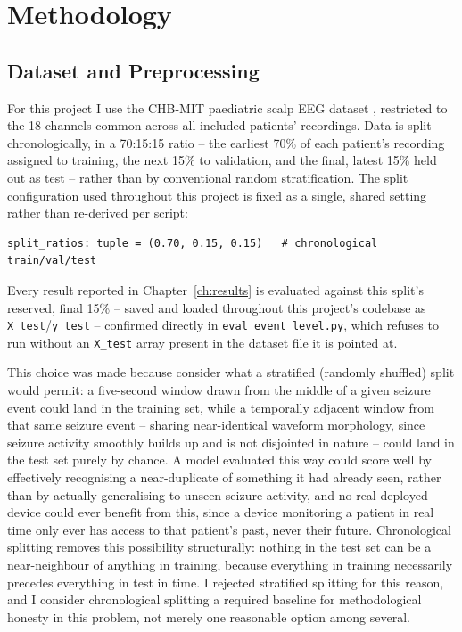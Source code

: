 \chapter{Methodology}
\label{ch:methodology}

\section{Dataset and Preprocessing}

For this project I use the CHB-MIT paediatric scalp EEG dataset \citep{goldberger2000}, restricted to the 18 channels common across all included patients' recordings. Data is split chronologically, 
in a 70:15:15 ratio -- the earliest 70\% of each patient's recording assigned to training, the next 15\% to validation, and the final, latest 15\% held out as test -- rather than by 
conventional random stratification. The split configuration used throughout this project is fixed as a single, shared setting rather than re-derived per script:

\begin{verbatim}
split_ratios: tuple = (0.70, 0.15, 0.15)   # chronological train/val/test
\end{verbatim}

Every result reported in Chapter~\ref{ch:results} is evaluated against this split's reserved, final 15\% -- saved and loaded throughout this project's codebase as \texttt{X\_test}/\texttt{y\_test} -- confirmed directly in \texttt{eval\_event\_level.py}, which refuses to run without an \texttt{X\_test} array present in the dataset file it is pointed at.

This choice was made because consider what a stratified (randomly shuffled) split would permit: a five-second 
window drawn from the middle of a given seizure event could land in the training set, while a temporally adjacent window from that same seizure event -- sharing near-identical 
waveform morphology, since seizure activity smoothly builds up and is not disjointed in nature -- could land in the test set purely by chance. A model evaluated 
this way could score well by effectively recognising a near-duplicate of something it had already seen, rather than by actually generalising to unseen seizure activity, and no real 
deployed device could ever benefit from this, since a device monitoring a patient in real time only ever has access to that patient's past, never their future. 
Chronological splitting removes this possibility structurally: nothing in the test set can be a near-neighbour of anything in training, because everything in training necessarily 
precedes everything in test in time. I rejected stratified splitting for this reason, and I consider chronological splitting a required baseline for methodological honesty in this 
problem, not merely one reasonable option among several.

